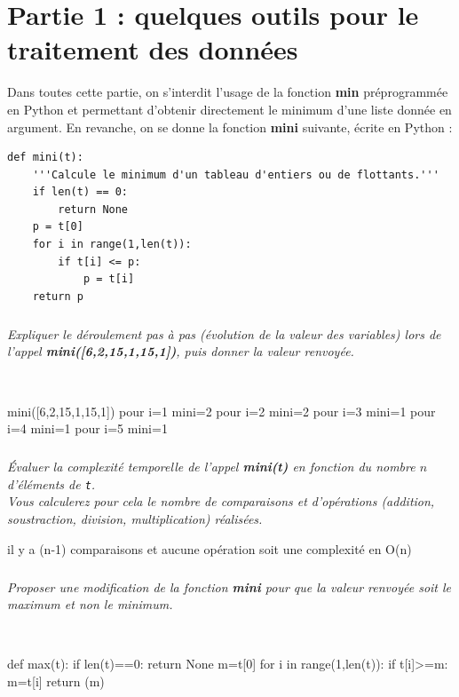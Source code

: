 \documentclass[10pt,fleqn]{article} %
\begin{document}

\section*{Partie 1 : quelques outils pour le traitement des données}

Dans toutes cette partie, on s'interdit l'usage de la fonction \textbf{min}
préprogrammée en Python et permettant d'obtenir directement le minimum d'une 
liste donnée en argument. En revanche, on se donne la fonction 
\textbf{mini} suivante, écrite en Python :

\begin{py}
\begin{lstlisting}
def mini(t):
    '''Calcule le minimum d'un tableau d'entiers ou de flottants.'''
    if len(t) == 0:
        return None
    p = t[0]
    for i in range(1,len(t)):
        if t[i] <= p:
            p = t[i]
    return p
\end{lstlisting}
\end{py}

\subparagraph{}
\textit{Expliquer le déroulement pas à pas (évolution de la valeur des
  variables) lors de l'appel   \textbf{mini([6,2,15,1,15,1])}, puis donner la valeur   renvoyée.}
	

\ifprof
\begin{corrige}~\
\begin{python}
mini([6,2,15,1,15,1])
pour i=1 mini=2
pour i=2 mini=2
pour i=3 mini=1
pour i=4 mini=1
pour i=5 mini=1
\end{python}
\end{corrige}
\else
\fi

\subparagraph{}
\textit{Évaluer la complexité temporelle de l'appel \textbf{mini(t)} en fonction du nombre $n$ 
d'éléments de  \texttt{t}.\\
Vous calculerez pour cela le nombre de comparaisons et d'opérations (addition, soustraction, division, multiplication) réalisées.}

\ifprof
\begin{corrige}
il y a (n-1) comparaisons et aucune opération soit une complexité en O(n)
\end{corrige}
\else
\fi

\subparagraph{}
 \textit{Proposer une modification de la fonction \textbf{mini} pour que la valeur
  renvoyée soit le \emph{maximum} et non le \emph{minimum}.}
	
\ifprof
\begin{corrige}~\
\begin{python}
def max(t):
    if len(t)==0:
        return None
    m=t[0]
    for i in range(1,len(t)):
        if t[i]>=m:
            m=t[i]
    return (m)
\end{python}
\end{corrige}
\else
\fi
	
\end{document}

